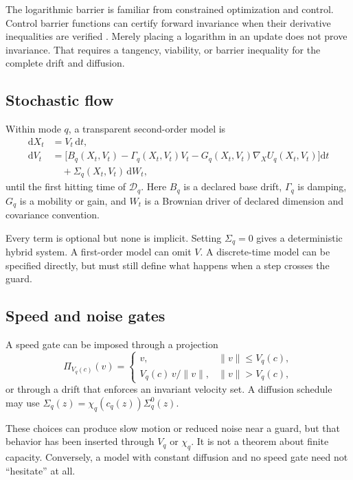\documentclass[11pt]{article}
\theoremstyle{definition}
\theoremstyle{remark}
\newcommand{\cD}{\mathcal D}
\newcommand{\dd}{\mathrm d}
\newcommand{\grad}{\nabla}
\begin{document}
The logarithmic barrier is familiar from constrained optimization and
control.  Control barrier functions can certify forward invariance when
their derivative inequalities are verified \cite{AmesEtAl2017}.  Merely
placing a logarithm in an update does not prove invariance.  That requires
a tangency, viability, or barrier inequality for the complete drift and
diffusion.

\subsection{Stochastic flow}

Within mode $q$, a transparent second-order model is
\begin{align}
 \dd X_t &= V_t\,\dd t, \label{eq:flow-x}\\
 \dd V_t
 &=
 \bigl[
 B_q(X_t,V_t)
 -\Gamma_q(X_t,V_t)V_t
 -G_q(X_t,V_t)\grad_X U_q(X_t,V_t)
 \bigr]\dd t
 \nonumber\\
 &\quad
 +\Sigma_q(X_t,V_t)\,\dd W_t,
 \label{eq:flow-v}
\end{align}
until the first hitting time of $\cD_q$.  Here $B_q$ is a declared base
drift, $\Gamma_q$ is damping, $G_q$ is a mobility or gain, and $W_t$ is a
Brownian driver of declared dimension and covariance convention.

Every term is optional but none is implicit.  Setting $\Sigma_q=0$ gives a
deterministic hybrid system.  A first-order model can omit $V$.  A
discrete-time model can be specified directly, but must still define what
happens when a step crosses the guard.

\subsection{Speed and noise gates}

A speed gate can be imposed through a projection
\[
 \Pi_{V_q(c)}(v)
 =
 \begin{cases}
 v,&\|v\|\le V_q(c),\\[0.3em]
 V_q(c)\,v/\|v\|,&\|v\|>V_q(c),
 \end{cases}
\]
or through a drift that enforces an invariant velocity set.  A diffusion
schedule may use $\Sigma_q(z)=\chi_q(c_q(z))\Sigma_q^0(z)$.

These choices can produce slow motion or reduced noise near a guard, but
that behavior has been inserted through $V_q$ or $\chi_q$.  It is not a
theorem about finite capacity.  Conversely, a model with constant
diffusion and no speed gate need not ``hesitate'' at all.
\end{document}
